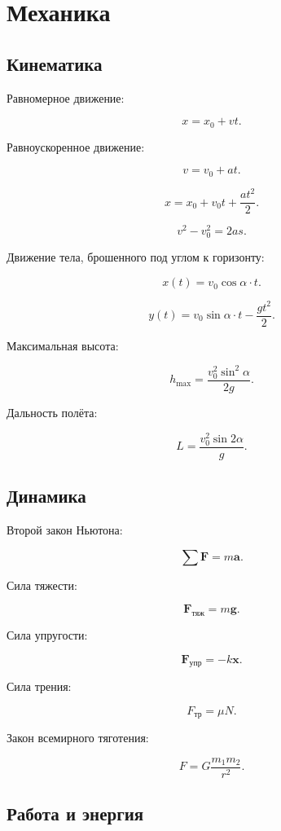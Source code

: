 \documentclass[12pt,a4paper]{article}
\theoremstyle{definition}
\theoremstyle{remark}
\newcommand{\vect}[1]{\bm{#1}}
\begin{document}

\section{Механика}

\subsection{Кинематика}

Равномерное движение:

\[
    x=x_0+vt.
\]

Равноускоренное движение:

\[
    v=v_0+at.
\]

\[
    x=x_0+v_0t+\frac{at^2}{2}.
\]

\[
    v^2-v_0^2=2as.
\]

Движение тела, брошенного под углом к горизонту:

\[
    x(t)=v_0\cos\alpha\cdot t.
\]

\[
    y(t)=v_0\sin\alpha\cdot t-\frac{gt^2}{2}.
\]

Максимальная высота:

\[
    h_{\max}
    =
    \frac{v_0^2\sin^2\alpha}{2g}.
\]

Дальность полёта:

\[
    L
    =
    \frac{v_0^2\sin2\alpha}{g}.
\]

\subsection{Динамика}

Второй закон Ньютона:

\[
    \sum\vect{F}=m\vect{a}.
\]

Сила тяжести:

\[
    \vect{F}_{\text{тяж}}=m\vect{g}.
\]

Сила упругости:

\[
    \vect{F}_{\text{упр}}=-k\vect{x}.
\]

Сила трения:

\[
    F_{\text{тр}}=\mu N.
\]

Закон всемирного тяготения:

\[
    F
    =
    G\frac{m_1m_2}{r^2}.
\]

\subsection{Работа и энергия}
\end{document}
